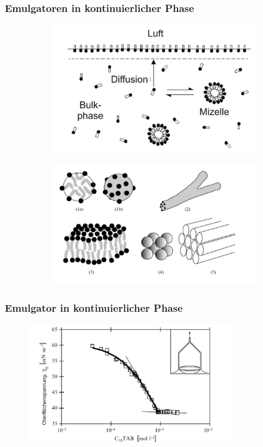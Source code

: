 \documentclass{beamer} %
\begin{document}
\begin{frame}
\frametitle{Emulgatoren in kontinuierlicher Phase}
\begin{figure}[H]
\centering
\begin{subfigure}[c]{0.5\textwidth}
\centering
\includegraphics[width = 1\textwidth]{BulkPhase.JPG}
\end{subfigure}
\begin{subfigure}[c]{0.45\textwidth}
\centering
\includegraphics[width = 1\textwidth]{Mizellenarten.JPG}
\end{subfigure}
\end{figure}
\end{frame}

\begin{frame}
\frametitle{Emulgator in kontinuierlicher Phase}
\begin{figure}
\centering
\includegraphics[width = 0.8\textwidth]{Oberflachenspannung.JPG}
\end{figure}
\end{frame}
\end{document}
